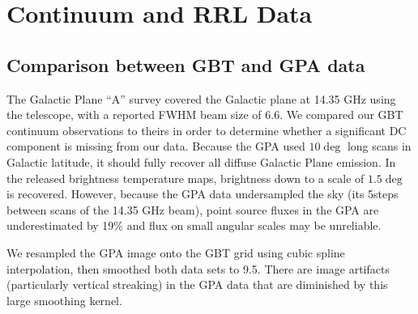 \clearpage
\appendix
\section{Continuum and RRL Data}
\label{sec:contrrldata}

\subsection{Comparison between GBT and GPA data}
\label{sec:gpacompare}
The Galactic Plane ``A'' survey \citep{Langston2000a} covered the Galactic
plane at 14.35 GHz using the  telescope,
with a reported FWHM beam size of 6.6\arcmin. %
  We compared our GBT
continuum observations to theirs in order to determine whether a significant DC
component is missing from our data.
Because the GPA used $10\deg$ long scans in Galactic latitude, it should fully
recover all diffuse Galactic Plane emission.  In the released brightness temperature
maps, brightness down to a scale of $1.5\deg$ is recovered.  However, because
the GPA data undersampled the sky (its 5\arcmin steps between scans  of the 14.35 GHz beam), point source
fluxes in the GPA are underestimated by 19\% and flux on small angular scales
may be unreliable.


We resampled the GPA image onto the GBT grid using cubic spline interpolation,
then smoothed both data sets to 9.5\arcmin.  There are image artifacts
(particularly vertical streaking) in the GPA data that are diminished by this
large smoothing kernel.

